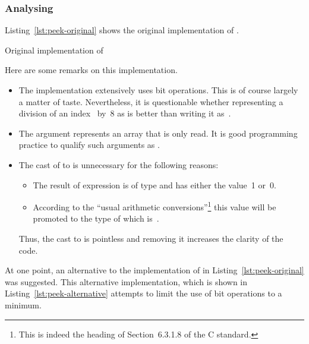 \subsubsection{Analysing \peek}

Listing~\ref{lst:peek-original} shows the original implementation of \peek.


\begin{listing}[hbt]
\begin{minipage}{\textwidth}

\end{minipage}
\caption{\label{lst:peek-original} Original implementation of \peek}
\end{listing}

Here are some remarks on this implementation.

\begin{itemize}
\item The implementation extensively uses bit operations.
      This is of course largely a matter of taste.
      Nevertheless, it is questionable whether representing a division 
      of an index~ by~8 as  is better than writing it as~.
\item The argument  represents an array that is only read.
      It is good programming practice to qualify such arguments as .

\item The cast of  to  is unnecessary for the following reasons:
\begin{itemize}
\item The result of expression  is of type  and has either the value~1 or~0.
\item According to the ``usual arithmetic conversions''\footnote{%
     This is indeed the heading of Section~6.3.1.8 of the C standard.
}
this value will be promoted to the type of  which is~.
\end{itemize}

    Thus, the cast to  is pointless and removing it increases the clarity of the code.

\end{itemize}

At one point, an alternative to the implementation of \peek in
Listing~\ref{lst:peek-original} was suggested.
This alternative implementation, which is shown in Listing~\ref{lst:peek-alternative}
attempts to limit the use of bit operations to a minimum.


